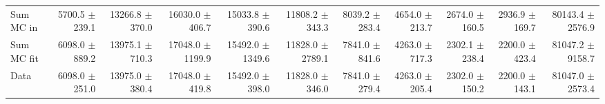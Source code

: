 \begin{table}[htbp]
{\begin{tabular}{lrrrrrrrrrr}
\hline
Sum MC in & 5700.5 $\pm$ 239.1 & 13266.8 $\pm$ 370.0 & 16030.0 $\pm$ 406.7 & 15033.8 $\pm$ 390.6 & 11808.2 $\pm$ 343.3 & 8039.2 $\pm$ 283.4 & 4654.0 $\pm$ 213.7 & 2674.0 $\pm$ 160.5 & 2936.9 $\pm$ 169.7& 80143.4 $\pm$ 2576.9 \\
Sum MC fit & 6098.0 $\pm$ 889.2 & 13975.1 $\pm$ 710.3 & 17048.0 $\pm$ 1199.9 & 15492.0 $\pm$ 1349.6 & 11828.0 $\pm$ 2789.1 & 7841.0 $\pm$ 841.6 & 4263.0 $\pm$ 717.3 & 2302.1 $\pm$ 238.4 & 2200.0 $\pm$ 423.4 & 81047.2 $\pm$ 9158.7 \\
\hline
Data & 6098.0 $\pm$ 251.0 & 13975.0 $\pm$ 380.4 & 17048.0 $\pm$ 419.8 & 15492.0 $\pm$ 398.0 & 11828.0 $\pm$ 346.0 & 7841.0 $\pm$ 279.4 & 4263.0 $\pm$ 205.4 & 2302.0 $\pm$ 150.2 & 2200.0 $\pm$ 143.1 & 81047.0 $\pm$ 2573.4 \\
\hline
\end{tabular}
}
\end{table}
